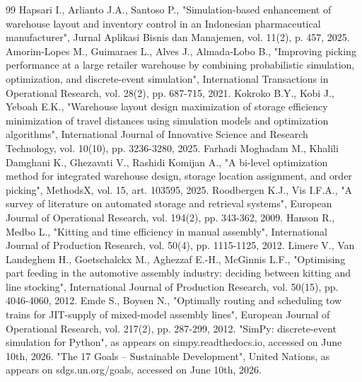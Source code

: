 \begin{thebibliography}{99}
 Hapsari I., Arlianto J.A., Santoso P., "Simulation-based enhancement of warehouse layout and inventory control in an Indonesian pharmaceutical manufacturer", Jurnal Aplikasi Bisnis dan Manajemen, vol. 11(2), p. 457, 2025.
 Amorim-Lopes M., Guimaraes L., Alves J., Almada-Lobo B., "Improving picking performance at a large retailer warehouse by combining probabilistic simulation, optimization, and discrete-event simulation", International Transactions in Operational Research, vol. 28(2), pp. 687-715, 2021.
 Kokroko B.Y., Kobi J., Yeboah E.K., "Warehouse layout design maximization of storage efficiency minimization of travel distances using simulation models and optimization algorithms", International Journal of Innovative Science and Research Technology, vol. 10(10), pp. 3236-3280, 2025.
 Farhadi Moghadam M., Khalili Damghani K., Ghezavati V., Rashidi Komijan A., "A bi-level optimization method for integrated warehouse design, storage location assignment, and order picking", MethodsX, vol. 15, art. 103595, 2025.
 Roodbergen K.J., Vis I.F.A., "A survey of literature on automated storage and retrieval systems", European Journal of Operational Research, vol. 194(2), pp. 343-362, 2009.
 Hanson R., Medbo L., "Kitting and time efficiency in manual assembly", International Journal of Production Research, vol. 50(4), pp. 1115-1125, 2012.
 Limere V., Van Landeghem H., Goetschalckx M., Aghezzaf E.-H., McGinnis L.F., "Optimising part feeding in the automotive assembly industry: deciding between kitting and line stocking", International Journal of Production Research, vol. 50(15), pp. 4046-4060, 2012.
 Emde S., Boysen N., "Optimally routing and scheduling tow trains for JIT-supply of mixed-model assembly lines", European Journal of Operational Research, vol. 217(2), pp. 287-299, 2012.
 "SimPy: discrete-event simulation for Python", as appears on simpy.readthedocs.io, accessed on June 10th, 2026.
 "The 17 Goals -- Sustainable Development", United Nations, as appears on sdgs.un.org/goals, accessed on June 10th, 2026.
\end{thebibliography}
\endgroup
